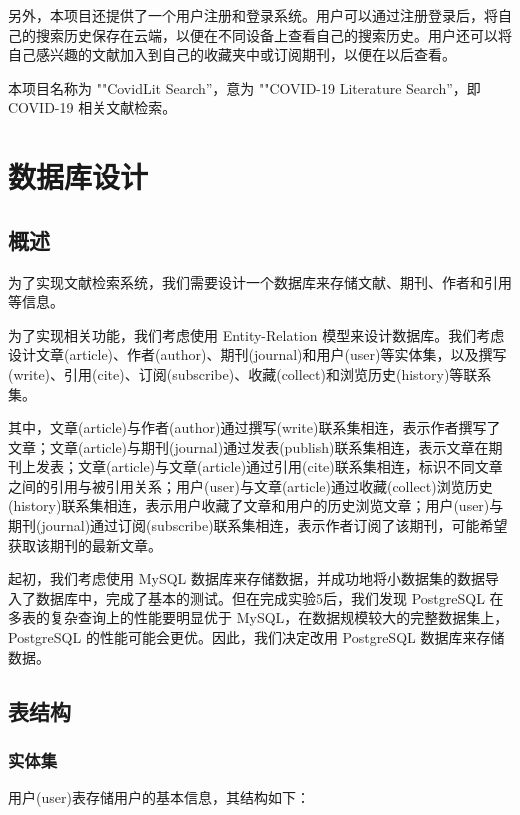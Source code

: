 \documentclass[UTF8,openany]{ctexbook}
\begin{document}
另外，本项目还提供了一个用户注册和登录系统。用户可以通过注册登录后，将自己的搜索历史保存在云端，以便在不同设备上查看自己的搜索历史。用户还可以将自己感兴趣的文献加入到自己的收藏夹中或订阅期刊，以便在以后查看。

本项目名称为 ""CovidLit Search''，意为 ""COVID-19 Literature Search''，即 COVID-19 相关文献检索。

\chapter{数据库设计}

\section{概述}
\label{sec:overviewOfDatabaseDesign}

为了实现文献检索系统，我们需要设计一个数据库来存储文献、期刊、作者和引用等信息。

为了实现相关功能，我们考虑使用 Entity-Relation 模型来设计数据库。我们考虑设计文章(article)、作者(author)、期刊(journal)和用户(user)等实体集，以及撰写(write)、引用(cite)、订阅(subscribe)、收藏(collect)和浏览历史(history)等联系集。

其中，文章(article)与作者(author)通过撰写(write)联系集相连，表示作者撰写了文章；文章(article)与期刊(journal)通过发表(publish)联系集相连，表示文章在期刊上发表；文章(article)与文章(article)通过引用(cite)联系集相连，标识不同文章之间的引用与被引用关系；用户(user)与文章(article)通过收藏(collect)浏览历史(history)联系集相连，表示用户收藏了文章和用户的历史浏览文章；用户(user)与期刊(journal)通过订阅(subscribe)联系集相连，表示作者订阅了该期刊，可能希望获取该期刊的最新文章。

起初，我们考虑使用 MySQL 数据库来存储数据，并成功地将小数据集的数据导入了数据库中，完成了基本的测试。但在完成实验5后，我们发现 PostgreSQL 在多表的复杂查询上的性能要明显优于 MySQL，在数据规模较大的完整数据集上，PostgreSQL 的性能可能会更优。因此，我们决定改用 PostgreSQL 数据库来存储数据。

\section{表结构}

\subsection{实体集}
\label{sec:entities}

用户(user)表存储用户的基本信息，其结构如下：
\end{document}
